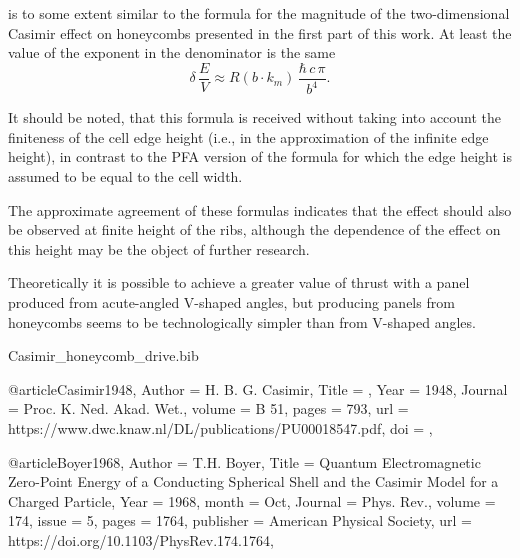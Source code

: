 \documentclass[twoside, 10pt]{article}
\def\myfilename{Casimir_honeycomb_drive}
\begin{document}
\begin{multicols}{2}
is to some extent similar to the formula for the magnitude of the
two-dimensional Casimir effect on honeycombs presented in the first part
of this work. At least the value of the exponent in the denominator is
the same
\noindent
\begin{equation}\delta\,\frac{E}{V} \approx R\left(b \cdot k_m\right)\,\frac{\hbar\,c\,\pi}{b^4}.\end{equation}

It should be noted, that this formula is received without taking
into account the finiteness of the cell edge height (i.e., in
the approximation of the infinite edge height), in contrast to the PFA
version of the formula for which the edge height is assumed to be equal
to the cell width.

The approximate agreement of these formulas indicates that the
effect should also be observed at finite height of the ribs, although
the dependence of the effect on this height may be the object of further
research.

Theoretically it is possible to achieve a greater value of thrust with a
panel produced from acute-angled \mbox{V-shaped} angles, but producing
panels from honeycombs seems to be technologically simpler than
from \mbox{V-shaped} angles.


\begin{filecontents}{\myfilename.bib}


@article{Casimir1948,
    Author = {H. B. G. Casimir},
    Title = {},
    Year = {1948},
    Journal = {Proc. K. Ned. Akad. Wet.},
    volume = {B 51},
    pages = {793},
    url = {https://www.dwc.knaw.nl/DL/publications/PU00018547.pdf},
    doi = {},
}


@article{Boyer1968,
    Author = {T.H. Boyer},
    Title = {Quantum Electromagnetic Zero-Point Energy of a Conducting Spherical Shell and the Casimir Model for a Charged Particle},
    Year = {1968},
    month = {Oct},
    Journal = {Phys. Rev.},
    volume = {174},
    issue = {5},
    pages = {1764},
    publisher = {American Physical Society},
    url = {https://doi.org/10.1103/PhysRev.174.1764},
}


\end{filecontents}
\end{multicols}
\end{document}
